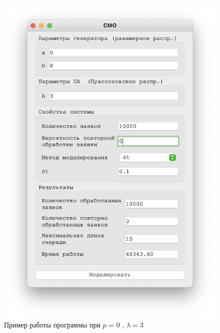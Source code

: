 \begin{figure}[!htb]
\begin{minipage}{0.55\textwidth}
      \includegraphics[width=1\linewidth]{3-0-t}
    \end{minipage}
    \caption{Пример работы программы при $p$ = 0 , $\lambda = 3$}
 \end{figure}
 


